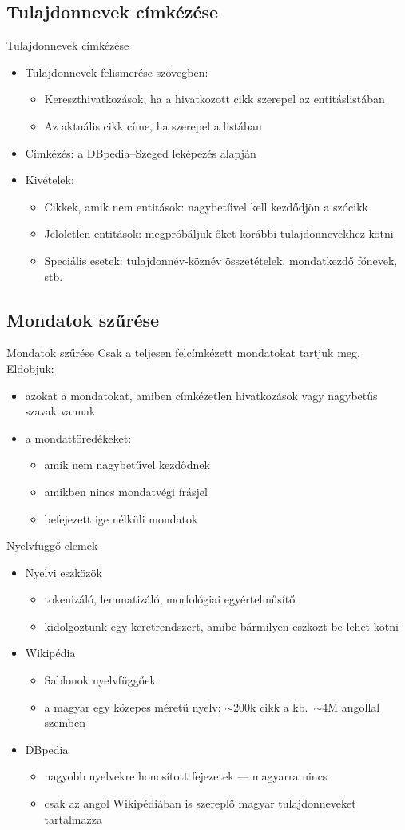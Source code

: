 \documentclass[utf8x,t]{beamer}
\newcommand{\vitem}{\item \vspace{4pt}}
\newcommand{\nagytilde}{$\sim$}
\begin{document}
\subsection{Tulajdonnevek címkézése}
\begin{frame}{Tulajdonnevek címkézése}
  \bigskip
  \begin{itemize}
  \vitem Tulajdonnevek felismerése szövegben:
    \begin{itemize}
    \vitem Kereszthivatkozások, ha a hivatkozott cikk szerepel az entitáslistában
    \vitem Az aktuális cikk címe, ha szerepel a listában
    \end{itemize}
  \vitem Címkézés: a DBpedia--Szeged leképezés alapján
  \vitem Kivételek:
    \begin{itemize}
    \vitem Cikkek, amik nem entitások: nagybetűvel kell kezdődjön a szócikk
    \vitem Jelöletlen entitások: megpróbáljuk őket korábbi tulajdonnevekhez kötni
    \vitem Speciális esetek: tulajdonnév-köznév összetételek, mondatkezdő főnevek, stb.
    \end{itemize}
  \end{itemize}
\end{frame}

\subsection{Mondatok szűrése}
\begin{frame}{Mondatok szűrése}
  \bigskip
  Csak a teljesen felcímkézett mondatokat tartjuk meg. Eldobjuk:
  \begin{itemize}
  \vitem azokat a mondatokat, amiben címkézetlen hivatkozások vagy nagybetűs szavak vannak
  \vitem a mondattöredékeket:
    \begin{itemize}
    \vitem amik nem nagybetűvel kezdődnek
    \vitem amikben nincs mondatvégi írásjel
    \vitem befejezett ige nélküli mondatok %
    \end{itemize}
  \end{itemize}
\end{frame}

\begin{frame}{Nyelvfüggő elemek}
  \begin{itemize}
  \vitem Nyelvi eszközök
    \begin{itemize}
    \vitem tokenizáló, lemmatizáló, morfológiai egyértelműsítő
    \vitem kidolgoztunk egy keretrendszert, amibe bármilyen eszközt be lehet kötni
    \end{itemize}
  \vitem Wikipédia
    \begin{itemize}
    \vitem Sablonok nyelvfüggőek
    \vitem a magyar egy közepes méretű nyelv: \nagytilde 200k cikk a kb.~\nagytilde 4M angollal szemben
    \end{itemize}
  \vitem DBpedia
    \begin{itemize}
    \vitem nagyobb nyelvekre honosított fejezetek --- magyarra nincs
    \vitem csak az angol Wikipédiában is szereplő magyar tulajdonneveket tartalmazza
    \end{itemize}
  \end{itemize}
\end{frame}
\end{document}
